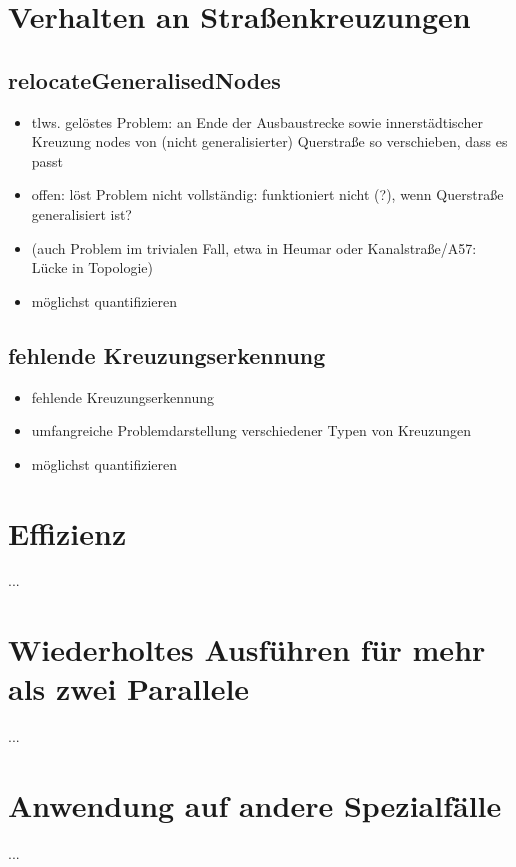 \documentclass[../main/thesis.tex]{subfiles}
\begin{document}
\section{Verhalten an Straßenkreuzungen}

\subsection{relocateGeneralisedNodes}

\begin{itemize}
\item tlws. gelöstes Problem: an Ende der Ausbaustrecke sowie innerstädtischer Kreuzung nodes von (nicht generalisierter) Querstraße so verschieben, dass es passt
\item offen: löst Problem nicht vollständig: funktioniert nicht (?), wenn Querstraße generalisiert ist?
\item (auch Problem im trivialen Fall, etwa in Heumar oder Kanalstraße/A57: Lücke in Topologie)
\item möglichst quantifizieren
\end{itemize}




\subsection{fehlende Kreuzungserkennung}

\begin{itemize}
\item fehlende Kreuzungserkennung
\item umfangreiche Problemdarstellung verschiedener Typen von Kreuzungen
\item möglichst quantifizieren
\end{itemize}



\section{Effizienz}

...



\section{Wiederholtes Ausführen für mehr als zwei Parallele}

...



\section{Anwendung auf andere Spezialfälle}

...



\end{document}
